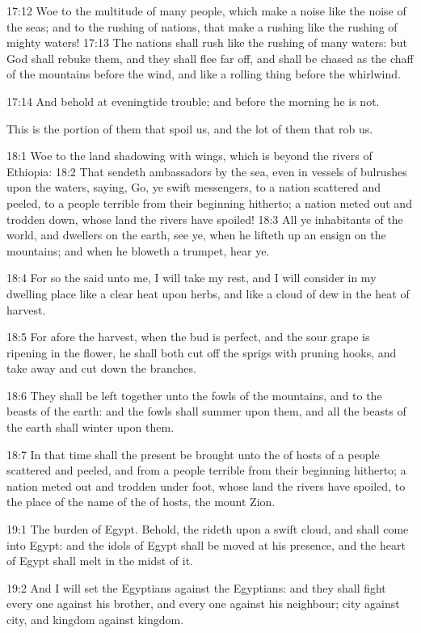 17:12 Woe to the multitude of many people, which make a noise like the
noise of the seas; and to the rushing of nations, that make a rushing
like the rushing of mighty waters!  17:13 The nations shall rush like
the rushing of many waters: but God shall rebuke them, and they shall
flee far off, and shall be chased as the chaff of the mountains before
the wind, and like a rolling thing before the whirlwind.

17:14 And behold at eveningtide trouble; and before the morning he is
not.

This is the portion of them that spoil us, and the lot of them that
rob us.

18:1 Woe to the land shadowing with wings, which is beyond the rivers
of Ethiopia: 18:2 That sendeth ambassadors by the sea, even in vessels
of bulrushes upon the waters, saying, Go, ye swift messengers, to a
nation scattered and peeled, to a people terrible from their beginning
hitherto; a nation meted out and trodden down, whose land the rivers
have spoiled!  18:3 All ye inhabitants of the world, and dwellers on
the earth, see ye, when he lifteth up an ensign on the mountains; and
when he bloweth a trumpet, hear ye.

18:4 For so the \LORD said unto me, I will take my rest, and I will
consider in my dwelling place like a clear heat upon herbs, and like a
cloud of dew in the heat of harvest.

18:5 For afore the harvest, when the bud is perfect, and the sour
grape is ripening in the flower, he shall both cut off the sprigs with
pruning hooks, and take away and cut down the branches.

18:6 They shall be left together unto the fowls of the mountains, and
to the beasts of the earth: and the fowls shall summer upon them, and
all the beasts of the earth shall winter upon them.

18:7 In that time shall the present be brought unto the \LORD of hosts
of a people scattered and peeled, and from a people terrible from
their beginning hitherto; a nation meted out and trodden under foot,
whose land the rivers have spoiled, to the place of the name of the
\LORD of hosts, the mount Zion.

19:1 The burden of Egypt. Behold, the \LORD rideth upon a swift cloud,
and shall come into Egypt: and the idols of Egypt shall be moved at
his presence, and the heart of Egypt shall melt in the midst of it.

19:2 And I will set the Egyptians against the Egyptians: and they
shall fight every one against his brother, and every one against his
neighbour; city against city, and kingdom against kingdom.

